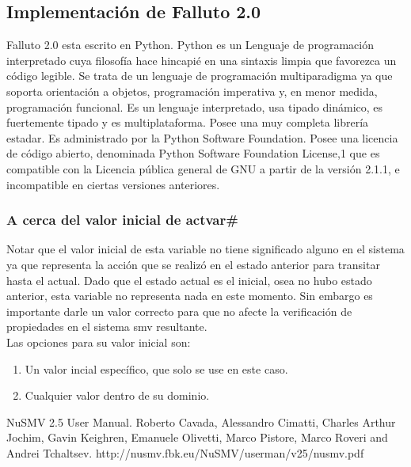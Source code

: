 \documentclass[titlepage, 10pt]{article}
\begin{document}
\subsection{Implementaci\'on de Falluto 2.0}

Falluto 2.0 esta escrito en Python. Python es un Lenguaje de programación interpretado cuya filosof\'ia hace hincapi\'e en una sintaxis limpia que favorezca un c\'odigo legible.
Se trata de un lenguaje de programaci\'on multiparadigma ya que soporta orientaci\'on a objetos, programaci\'on imperativa y, en menor medida, programaci\'on funcional. Es un lenguaje interpretado, usa tipado din\'amico, es fuertemente tipado y es multiplataforma. Posee una muy completa librer\'ia estadar.
Es administrado por la Python Software Foundation. Posee una licencia de c\'odigo abierto, denominada Python Software Foundation License,1 que es compatible con la Licencia p\'ublica general de GNU a partir de la versión 2.1.1, e incompatible en ciertas versiones anteriores.


\subsubsection{A cerca del valor inicial de actvar\#}

Notar que el valor inicial de esta variable no tiene significado alguno en el
sistema ya que representa la acci\'{o}n que se realiz\'{o} en el estado anterior para 
transitar hasta el actual. Dado que el estado actual es el inicial, osea no hubo
estado anterior, esta variable no representa nada en este momento. Sin embargo
es importante darle un valor correcto para que no afecte la verificaci\'{o}n de
propiedades en el sistema smv resultante.\\

\noindent Las opciones para su valor inicial son:\\
\begin{enumerate}

\item%
    Un valor incial espec\'{i}fico, que solo se use en este caso.
\item%
    Cualquier valor dentro de su dominio.
\end{enumerate}


\newpage %

\begin{thebibliography}{99}

 NuSMV 2.5 User Manual. Roberto Cavada, Alessandro Cimatti, Charles Arthur Jochim, Gavin Keighren,
Emanuele Olivetti, Marco Pistore, Marco Roveri and Andrei Tchaltsev. http://nusmv.fbk.eu/NuSMV/userman/v25/nusmv.pdf

\end{thebibliography}
\end{document}
